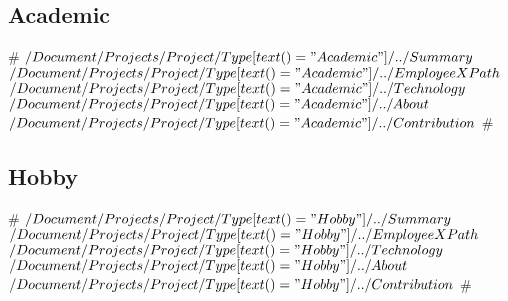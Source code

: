 \documentclass[11pt,a4paper,sans]{moderncv}
\begin{document}
\subsection{Academic}
#
{$/Document/Projects/Project/Type[text()="Academic"]/../Summary$}
{$/Document/Projects/Project/Type[text()="Academic"]/../EmployeeXPath$}
{$/Document/Projects/Project/Type[text()="Academic"]/../Technology$}{}
{$/Document/Projects/Project/Type[text()="Academic"]/../About$\newline{}
$/Document/Projects/Project/Type[text()="Academic"]/../Contribution$}
#

\subsection{Hobby}
#
{$/Document/Projects/Project/Type[text()="Hobby"]/../Summary$}
{$/Document/Projects/Project/Type[text()="Hobby"]/../EmployeeXPath$}
{$/Document/Projects/Project/Type[text()="Hobby"]/../Technology$}{}
{$/Document/Projects/Project/Type[text()="Hobby"]/../About$\newline{}$/Document/Projects/Project/Type[text()="Hobby"]/../Contribution$}
#
\end{document}
